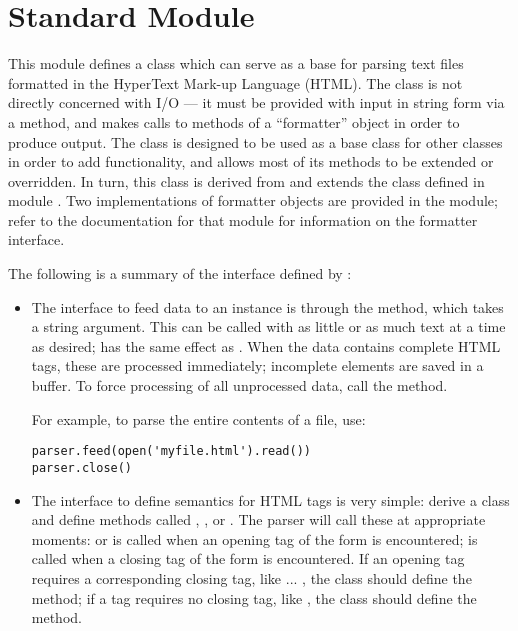 \section{Standard Module }

\renewcommand{\indexsubitem}{(in module htmllib)}

This module defines a class which can serve as a base for parsing text
files formatted in the HyperText Mark-up Language (HTML).  The class
is not directly concerned with I/O --- it must be provided with input
in string form via a method, and makes calls to methods of a
``formatter'' object in order to produce output.  The
 class is designed to be used as a base class for
other classes in order to add functionality, and allows most of its
methods to be extended or overridden.  In turn, this class is derived
from and extends the  class defined in module
.  Two implementations of formatter objects are
provided in the  module; refer to the documentation
for that module for information on the formatter interface.

The following is a summary of the interface defined by
:

\begin{itemize}

\item
The interface to feed data to an instance is through the 
method, which takes a string argument.  This can be called with as
little or as much text at a time as desired;  has the same effect as .  When the data
contains complete HTML tags, these are processed immediately;
incomplete elements are saved in a buffer.  To force processing of all
unprocessed data, call the  method.

For example, to parse the entire contents of a file, use:
\begin{verbatim}
parser.feed(open('myfile.html').read())
parser.close()
\end{verbatim}

\item
The interface to define semantics for HTML tags is very simple: derive
a class and define methods called ,
, or .  The parser will
call these at appropriate moments:  or
 is called when an opening tag of the form
 is encountered;  is called
when a closing tag of the form  is encountered.  If
an opening tag requires a corresponding closing tag, like 
... , the class should define the 
method; if a tag requires no closing tag, like , the class
should define the  method.

\end{itemize}

